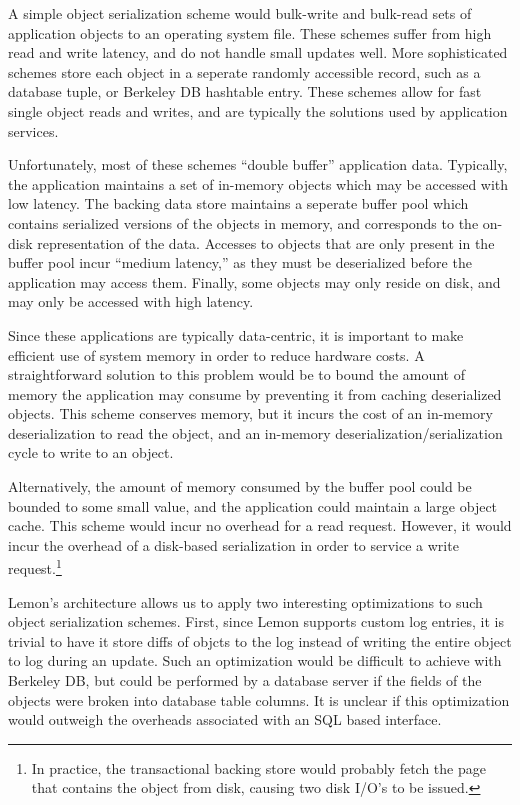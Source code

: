 \documentclass[letterpaper,twocolumn,english]{article}
\newcommand{\yad}{Lemon\xspace}
\begin{document}
A simple object serialization scheme would bulk-write and bulk-read
sets of application objects to an operating system file.  These
schemes suffer from high read and write latency, and do not handle
small updates well.  More sophisticated schemes store each object in a
seperate randomly accessible record, such as a database tuple, or
Berkeley DB hashtable entry.  These schemes allow for fast single
object reads and writes, and are typically the solutions used by
application services.

Unfortunately, most of these schemes ``double buffer'' application
data.  Typically, the application maintains a set of in-memory objects
which may be accessed with low latency.  The backing data store
maintains a seperate buffer pool which contains serialized versions of
the objects in memory, and corresponds to the on-disk representation
of the data.  Accesses to objects that are only present in the buffer
pool incur ``medium latency,'' as they must be deserialized before the
application may access them.  Finally, some objects may only reside on
disk, and may only be accessed with high latency.

Since these applications are typically data-centric, it is important
to make efficient use of system memory in order to reduce hardware
costs.  A straightforward solution to this problem would be to bound
the amount of memory the application may consume by preventing it from
caching deserialized objects.  This scheme conserves memory, but it
incurs the cost of an in-memory deserialization to read the object,
and an in-memory deserialization/serialization cycle to write to an
object.

Alternatively, the amount of memory consumed by the buffer pool could
be bounded to some small value, and the application could maintain a
large object cache.  This scheme would incur no overhead for a read
request.  However, it would incur the overhead of a disk-based
serialization in order to service a write request.\footnote{In
practice, the transactional backing store would probably fetch the
page that contains the object from disk, causing two disk I/O's to be
issued.}

\yad's architecture allows us to apply two interesting optimizations
to such object serialization schemes.  First, since \yad supports
custom log entries, it is trivial to have it store diffs of objcts to
the log instead of writing the entire object to log during an update.
Such an optimization would be difficult to achieve with Berkeley DB,
but could be performed by a database server if the fields of the
objects were broken into database table columns.  It is unclear if
this optimization would outweigh the overheads associated with an SQL
based interface.
\end{document}
